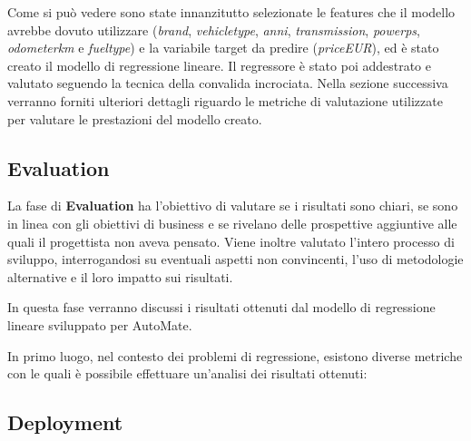 Come si può vedere sono state innanzitutto selezionate le features che il modello avrebbe dovuto utilizzare (\textit{brand}, \mbox{\textit{vehicle\textunderscore type}}, \textit{anni}, \textit{transmission}, \mbox{\textit{power\textunderscore ps}}, \mbox{\textit{odometer\textunderscore km}} e \textit{fuel\textunderscore type}) e la variabile target da predire \mbox{(\textit{price\textunderscore EUR})}, ed è stato creato il modello di regressione lineare. Il regressore è stato poi addestrato e valutato seguendo la tecnica della convalida incrociata. Nella sezione successiva verranno forniti ulteriori dettagli riguardo le metriche di valutazione utilizzate per valutare le prestazioni del modello creato.
\pagebreak

\subsection{Evaluation}
La fase di \textbf{Evaluation} ha l'obiettivo di valutare se i risultati sono chiari, se sono in linea con gli obiettivi di business e se rivelano delle prospettive aggiuntive alle quali il progettista non aveva pensato. Viene inoltre valutato l'intero processo di sviluppo, interrogandosi su eventuali aspetti non convincenti, l'uso di metodologie alternative e il loro impatto sui risultati.

In questa fase verranno discussi i risultati ottenuti dal modello di regressione lineare sviluppato per AutoMate.

In primo luogo, nel contesto dei problemi di regressione, esistono diverse metriche con le quali è possibile effettuare un'analisi dei risultati ottenuti:
\bigskip
\begin{itemize}
\centering
    
\end{itemize}


\subsection{Deployment}